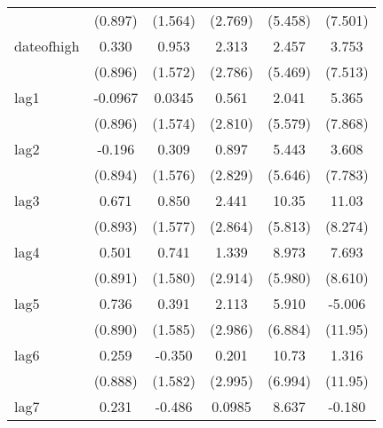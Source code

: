 {\begin{tabular}{l*{5}{c}}
            &     (0.897)         &     (1.564)         &     (2.769)         &     (5.458)         &     (7.501)         \\
[1em]
dateofhigh  &       0.330         &       0.953         &       2.313         &       2.457         &       3.753         \\
            &     (0.896)         &     (1.572)         &     (2.786)         &     (5.469)         &     (7.513)         \\
[1em]
lag1        &     -0.0967         &      0.0345         &       0.561         &       2.041         &       5.365         \\
            &     (0.896)         &     (1.574)         &     (2.810)         &     (5.579)         &     (7.868)         \\
[1em]
lag2        &      -0.196         &       0.309         &       0.897         &       5.443         &       3.608         \\
            &     (0.894)         &     (1.576)         &     (2.829)         &     (5.646)         &     (7.783)         \\
[1em]
lag3        &       0.671         &       0.850         &       2.441         &       10.35         &       11.03         \\
            &     (0.893)         &     (1.577)         &     (2.864)         &     (5.813)         &     (8.274)         \\
[1em]
lag4        &       0.501         &       0.741         &       1.339         &       8.973         &       7.693         \\
            &     (0.891)         &     (1.580)         &     (2.914)         &     (5.980)         &     (8.610)         \\
[1em]
lag5        &       0.736         &       0.391         &       2.113         &       5.910         &      -5.006         \\
            &     (0.890)         &     (1.585)         &     (2.986)         &     (6.884)         &     (11.95)         \\
[1em]
lag6        &       0.259         &      -0.350         &       0.201         &       10.73         &       1.316         \\
            &     (0.888)         &     (1.582)         &     (2.995)         &     (6.994)         &     (11.95)         \\
[1em]
lag7        &       0.231         &      -0.486         &      0.0985         &       8.637         &      -0.180         \\

\end{tabular}}
